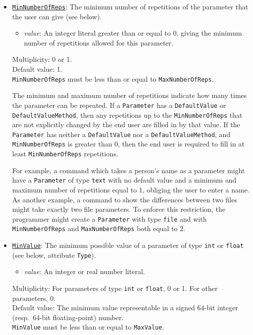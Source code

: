 \documentclass[11pt]{article}
\begin{document}
\begin{itemize}
\item \underline{\tt MinNumberOfReps}:  The minimum number of
repetitions of the parameter that the user can give (see below).
\begin{itemize}
\item {\it value}: An integer literal greater than or equal
  to 0, giving the
  minimum number of repetitions allowed for this parameter.
\end{itemize}
Multiplicity: 0 or 1. \\
Default value: 1. \\
{\tt MinNumberOfReps} must be less than or equal to {\tt MaxNumberOfReps}.

The minimum and maximum number of repetitions indicate how many
times the parameter can be repeated.  If a {\tt Parameter}
has a {\tt DefaultValue} or {\tt DefaultValueMethod}, then any
repetitions up to the {\tt MinNumberOfReps} that are not explicitly
changed by the end user are filled in by that value.  If the
{\tt Parameter} has neither a {\tt DefaultValue} nor a
{\tt DefaultValueMethod}, and {\tt MinNumberOfReps} is greater
than 0, then the end user is required to fill in at least
{\tt MinNumberOfReps} repetitions.

For example, a command which takes a person's name as a parameter
might have a {\tt Parameter} of type {\tt text} with no default
value and a minimum and maximum number of repetitions equal to 1,
obliging the user to enter a name.
As another example, a command to show the differences between two files
might take exactly two file parameters.  To enforce this
restriction, the programmer might create a {\tt Parameter} with
type {\tt file} and with {\tt MinNumberOfReps} and
{\tt MaxNumberOfReps} both equal to 2.

\item \underline{\tt MinValue}:  The minimum possible value of
a parameter of type {\tt int} or {\tt float}
(see below, attribute {\tt Type}).
\begin{itemize}
\item {\it value}: An integer or real number literal.
\end{itemize}
Multiplicity:  For parameters of type {\tt int} or {\tt float}, 0 or 1.
For other parameters, 0. \\
Default value:  The minimum value representable in a signed 64-bit integer
(resp.\ 64-bit floating-point) number. \\
{\tt MinValue} must be less than or equal to {\tt MaxValue}.


\end{itemize}
\end{document}
